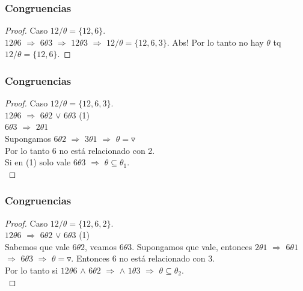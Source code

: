 \documentclass{beamer}
\begin{document}
\begin{frame}
\frametitle{Congruencias}
\begin{proof}
    \noindent Caso $12/\theta=\{12,6\}$.\\
    $12\theta 6$ $\Rightarrow$ $6\theta 3$ $\Rightarrow$ $12\theta 3$ $\Rightarrow$
    $12/\theta=\{12,6,3\}$. Abs! Por lo tanto no hay $\theta$ tq $12/\theta=\{12,6\}$.
\end{proof}
\end{frame}

\begin{frame}
\frametitle{Congruencias}
\begin{proof}
    \noindent Caso $12/\theta=\{12,6,3\}$.\\
    $12\theta 6$ $\Rightarrow$ $6\theta 2$ $\vee$ $6\theta 3$ (1)\\
    $6\theta 3$ $\Rightarrow$ $2\theta 1$\\
    Supongamos $6\theta 2$ $\Rightarrow$ $3\theta 1$ $\Rightarrow$
    $\theta=\triangledown$\\
    Por lo tanto 6 no está relacionado con 2.\\
    Si en (1) solo vale $6\theta 3$ $\Rightarrow$ $\theta \subseteq \theta_{1}$.\\
\end{proof}
\end{frame}

\begin{frame}
\frametitle{Congruencias}
\begin{proof}
    \noindent Caso $12/\theta=\{12,6,2\}$.\\
    $12\theta 6$ $\Rightarrow$ $6\theta 2$ $\vee$ $6\theta 3$ (1)\\
    Sabemos que vale $6\theta 2$, veamos $6\theta 3$. Supongamos que vale,
    entonces $2\theta 1$ $\Rightarrow$ $6\theta 1$ $\Rightarrow$ $6\theta 3$
    $\Rightarrow$ $\theta = \triangledown$. Entonces 6 no está relacionado con
    3.\\
    Por lo tanto si $12\theta 6$ $\wedge$ $6\theta 2$ $\Rightarrow$ $\wedge$
    $1\theta 3$ $\Rightarrow$ $\theta \subseteq \theta_{2}$.\\
\end{proof}
\end{frame}
\end{document}
